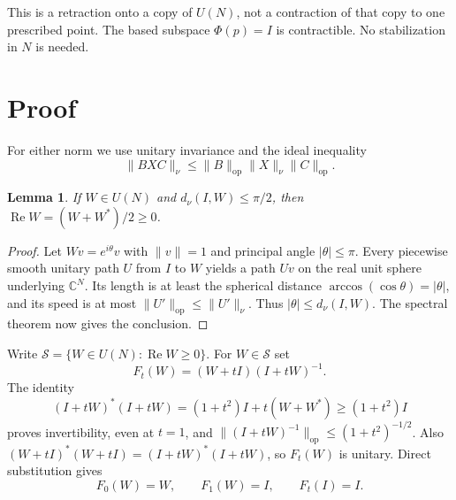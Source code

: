 \documentclass[11pt]{article}
\newtheorem{lemma}{Lemma}
\newcommand{\op}{\mathrm{op}}
\newcommand{\Ree}{\operatorname{Re}}
\begin{document}
This is a retraction onto a copy of $U(N)$, not a contraction of that copy to one prescribed point. The based subspace $\Phi(p)=I$ is contractible. No stabilization in $N$ is needed.

\section{Proof}
For either norm we use unitary invariance and the ideal inequality
\begin{equation}\label{eq:ideal}
 \|BXC\|_\nu\le\|B\|_{\op}\|X\|_\nu\|C\|_{\op}.
\end{equation}

\begin{lemma}\label{lem:semicircle}
If $W\in U(N)$ and $d_\nu(I,W)\le\pi/2$, then $\Ree W=(W+W^*)/2\ge0$.
\end{lemma}
\begin{proof}
Let $Wv=e^{i\theta}v$ with $\|v\|=1$ and principal angle $|\theta|\le\pi$. Every piecewise smooth unitary path $U$ from $I$ to $W$ yields a path $Uv$ on the real unit sphere underlying $\mathbb C^N$. Its length is at least the spherical distance $\arccos(\cos\theta)=|\theta|$, and its speed is at most $\|U'\|_{\op}\le\|U'\|_\nu$. Thus $|\theta|\le d_\nu(I,W)$. The spectral theorem now gives the conclusion.
\end{proof}

Write $\mathcal S=\{W\in U(N):\Ree W\ge0\}$. For $W\in\mathcal S$ set
\[
 F_t(W)=(W+tI)(I+tW)^{-1}.
\]
The identity
\begin{equation}\label{eq:inverse}
 (I+tW)^*(I+tW)=(1+t^2)I+t(W+W^*)\ge(1+t^2)I
\end{equation}
proves invertibility, even at $t=1$, and
$\|(I+tW)^{-1}\|_{\op}\le(1+t^2)^{-1/2}$.
Also $(W+tI)^*(W+tI)=(I+tW)^*(I+tW)$, so $F_t(W)$ is unitary. Direct substitution gives
\begin{equation}\label{eq:endpoints}
 F_0(W)=W,\qquad F_1(W)=I,\qquad F_t(I)=I.
\end{equation}
\end{document}
